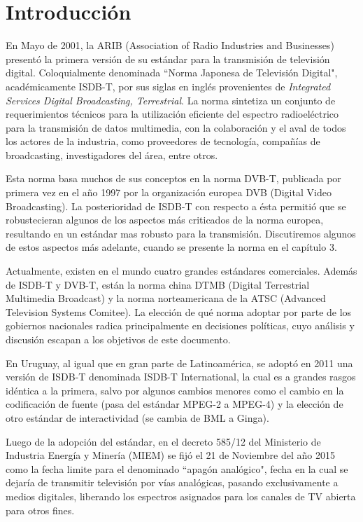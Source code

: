 \chapter{Introducción}

En Mayo de 2001, la ARIB (Association of Radio Industries and Businesses) presentó la primera versión de su estándar para la transmisión de televisión digital\cite{norma}. Coloquialmente denominada ``Norma Japonesa de Televisión Digital", académicamente ISDB-T, por sus siglas en inglés provenientes de \textit{Integrated Services Digital Broadcasting, Terrestrial}. La norma sintetiza un conjunto de requerimientos técnicos para la utilización eficiente del espectro radioeléctrico para la transmisión de datos multimedia, con la colaboración y el aval de todos los actores de la industria, como proveedores de tecnología, compañías de broadcasting, investigadores del área, entre otros.

Esta norma basa muchos de sus conceptos en la norma DVB-T, publicada por primera vez en el año 1997 por la organización europea DVB (Digital Video Broadcasting). La posterioridad de ISDB-T con respecto a ésta permitió que se robustecieran algunos de los aspectos más criticados de la norma europea, resultando en un estándar mas robusto para la transmisión. Discutiremos algunos de estos aspectos más adelante, cuando se presente la norma en el capítulo 3.

Actualmente, existen en el mundo cuatro grandes estándares comerciales. Además de \gls{ISDB-T} y \gls{DVB-T}, están la norma china \gls{DTMB} (Digital Terrestrial Multimedia Broadcast) y la norma norteamericana de la \gls{ATSC} (Advanced Television Systems Comitee). La elección de qué norma adoptar por parte de los gobiernos nacionales radica principalmente en decisiones políticas, cuyo análisis y discusión escapan a los objetivos de este documento.

En Uruguay, al igual que en gran parte de Latinoamérica, se adoptó en 2011 una versión de ISDB-T denominada ISDB-T International, la cual es a grandes rasgos idéntica a la primera, salvo por algunos cambios menores como el cambio en la codificación de fuente (pasa del estándar MPEG-2 a MPEG-4) y la elección de otro estándar de interactividad (se cambia de BML a Ginga).

Luego de la adopción del estándar, en el decreto 585/12 del Ministerio de Industria Energía y Minería (\gls{MIEM}) se fijó el 21 de Noviembre del año 2015 como la fecha limite para el denominado ``apagón analógico"\cite{decreto_apagon}, fecha en la cual se dejaría de transmitir televisión por vías analógicas, pasando exclusivamente a medios digitales, liberando los espectros asignados para los canales de TV abierta para otros fines. 

